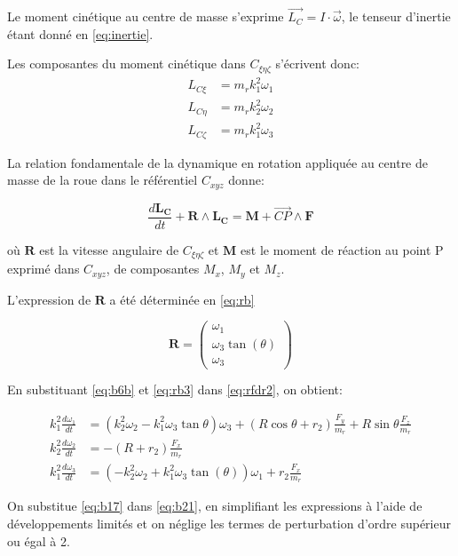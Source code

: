 Le moment cinétique au centre de masse s'exprime $\vec{L_{C}}=I \cdot \vec{\omega}$, le tenseur d'inertie étant donné en \ref{eq:inertie}.

Les composantes du moment cinétique dans $C_{\xi \eta \zeta}$ s'écrivent donc:
\begin{align}
    L_{C\xi }&=m_r k_1^2 \omega_{1} \nonumber\\
    L_{C\eta}&=m_r k_2^2 \omega_{2} \nonumber\\
    L_{C\zeta }&=m_r k_1^2 \omega_{3}
  \label{eq:b6b}
\end{align}

La relation fondamentale de la dynamique en rotation appliquée au centre de masse de la roue dans le référentiel $C_{xyz}$ donne:

\begin{equation}
    \frac{d \mathbf{L_{C}}}{dt} + \mathbf{R} \wedge \mathbf{L_{C}} = \mathbf{M}+ \overrightarrow{CP} \wedge \mathbf{F} 
\label{eq:rfdr2}
\end{equation}

où $\mathbf{R}$ est la vitesse angulaire de $C_{\xi \eta \zeta}$ et $\mathbf{M}$ est le moment de réaction au point P exprimé dans $C_{xyz}$, de composantes $M_x$, $M_y$ et $M_z$.

L'expression de $\mathbf{R}$ a été déterminée en \ref{eq:rb}

\begin{equation}
   \mathbf{R}= 
\begin{pmatrix}
    \omega_1  \\
    \omega_{3}\tan(\theta) \\
    \omega_3     
\end{pmatrix} 
\label{eq:rb3}
\end{equation}

En substituant \ref{eq:b6b} et \ref{eq:rb3} dans \ref{eq:rfdr2}, on obtient:

\begin{align}
    k_1^2\frac{d\omega_1}{dt} &=(k_2^2\omega_2-k_1^2\omega_3 \tan{\theta})\omega_3+(R\cos{\theta}+r_2)\frac{F_y}{m_r}+ R\sin{\theta}\frac{F_z}{m_r} \nonumber \\
    k_2^2\frac{d\omega_2}{dt} &=-(R+r_2) \frac{F_x}{m_r} \nonumber \\
    k_1^2\frac{d\omega_3}{dt} &=(-k_2^2\omega_2+k_1^2\omega_3 \tan(\theta))\omega_1 + r_2 \frac{F_x}{m_r}
  \label{eq:b21}
\end{align}

On substitue \ref{eq:b17} dans \ref{eq:b21}, en simplifiant les expressions à l'aide de développements limités et on néglige les termes de perturbation d'ordre supérieur ou égal à 2.

